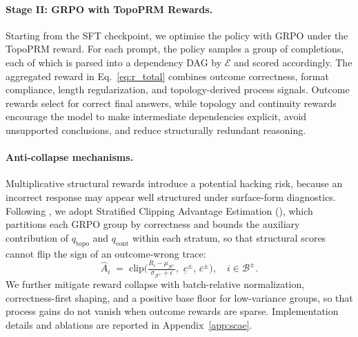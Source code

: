 \paragraph{Stage II: GRPO with TopoPRM Rewards.}
Starting from the SFT checkpoint, we optimise the policy with GRPO under the TopoPRM reward. For each prompt, the policy samples a group of completions, each of which is parsed into a dependency DAG by $\mathcal{E}$ and scored accordingly. The aggregated reward in Eq.~\ref{eq:r_total} combines outcome correctness, format compliance, length regularization, and topology-derived process signals. Outcome rewards select for correct final answers, while topology and continuity rewards encourage the model to make intermediate dependencies explicit, avoid unsupported conclusions, and reduce structurally redundant reasoning.

\paragraph{Anti-collapse mechanisms.}
Multiplicative structural rewards introduce a potential hacking risk, because an incorrect response may appear well structured under surface-form diagnostics. Following \citet{liu2026graph}, we adopt Stratified Clipping Advantage Estimation (\estimation), which partitions each GRPO group by correctness and bounds the auxiliary contribution of $q_{\mathrm{topo}}$ and $q_{\mathrm{cont}}$ within each stratum, so that structural scores cannot flip the sign of an outcome-wrong trace:
\begin{equation}
\label{eq:scae}
\widehat{A}_i \;=\;
\mathrm{clip}\!\Big(\tfrac{R_i-\mu_{\mathcal{B}^{\pm}}}{\sigma_{\mathcal{B}^{\pm}}+\epsilon},\,
\,\underline{c}^{\pm},\,\overline{c}^{\pm}\Big),
\quad i\in\mathcal{B}^{\pm}.
\end{equation}
We further mitigate reward collapse with batch-relative normalization, correctness-first shaping, and a positive base floor for low-variance groups, so that process gains do not vanish when outcome rewards are sparse. Implementation details and ablations are reported in Appendix~\ref{app:scae}.

